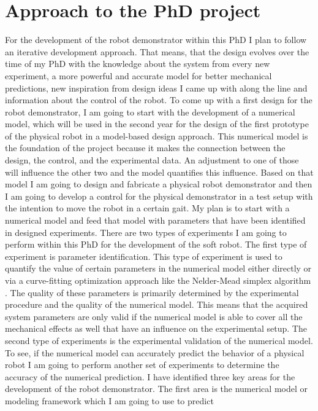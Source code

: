 \section{Approach to the PhD project} \label{sec:approach}
For the development of the robot demonstrator within this PhD I plan to follow an iterative development approach. That means, that the design evolves over the time of my PhD
 with the knowledge about the system from every new experiment, a more powerful and accurate model for better mechanical predictions, new inspiration from design ideas
 I came up with along the line and information about the control of the robot.
%
To come up with a first design for the robot demonstrator, I am going to start with the development of a numerical model, which will be used in the second year for the design
 of the first prototype of the physical robot in a model-based design approach. This numerical model is the foundation of the project because it makes the connection
 between the design, the control, and the experimental data. An adjustment to one of those will influence the other two and the model quantifies this influence. 
%
Based on that model I am going to design and fabricate a physical robot demonstrator and then I am going to develop a control for the physical demonstrator
 in a test setup with the intention to move the robot in a certain gait. 
%
My plan is to start with a numerical model and feed that model with parameters that have been identified in designed experiments. 
%
There are two types of experiments I am going to perform within this PhD for the development of the soft robot. 
The first type of experiment is parameter identification. This type of experiment is used to quantify the value of certain parameters in the numerical model either directly 
or via a curve-fitting optimization approach like the Nelder-Mead simplex algorithm \cite{Gao2012}. The quality of these parameters is primarily determined by the experimental
 procedure and the quality of the numerical model. 
This means that the acquired system parameters are only valid if the numerical model is able to cover all the mechanical effects as well that have an influence on the experimental setup. 
The second type of experiments is the experimental validation of the numerical model. To see, if the numerical model can accurately predict the behavior of a physical robot I 
am going to perform another set of experiments to determine the accuracy of the numerical prediction.
%
I have identified three key areas for the development of the robot demonstrator. The first area is the numerical model or modeling framework which I am going to use to predict 
